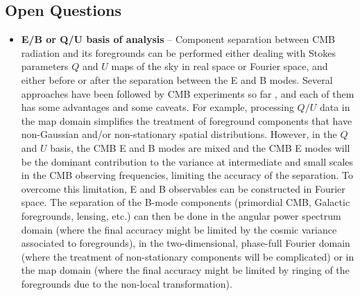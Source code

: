 \subsection{Open Questions}
\begin{itemize}
	\item \textbf{E/B or Q/U basis of analysis} -- Component separation between CMB radiation and its foregrounds can be performed either dealing with Stokes parameters $Q$ and $U$ maps of the sky in real space or Fourier space, and either before or after the separation between the E and B modes. Several approaches have been followed by CMB experiments so far \cite{Gold:2010fm,Aghanim:2015xee, Ade:2015tva},
and each of them has some advantages and some caveats. For example, processing $Q/U$ data in the map domain 
simplifies the treatment of foreground components that have non-Gaussian and/or non-stationary
spatial distributions.
However, in the $Q$ and $U$ basis, the CMB E and B modes are mixed and the CMB E modes will be the dominant contribution to the variance at intermediate and small scales in the CMB observing frequencies, limiting the accuracy of the separation.
To overcome this limitation, E and B observables can be constructed in Fourier space. 
The separation of the B-mode components (primordial CMB, Galactic foregrounds, lensing, etc.) can then be done in the angular power spectrum domain (where the final accuracy might be limited by the cosmic variance associated to foregrounds),
in the two-dimensional, phase-full Fourier domain (where the treatment of non-stationary components
will be complicated) or in the map domain (where the final accuracy might be limited by ringing of the foregrounds due to the non-local transformation). 

\end{itemize}
